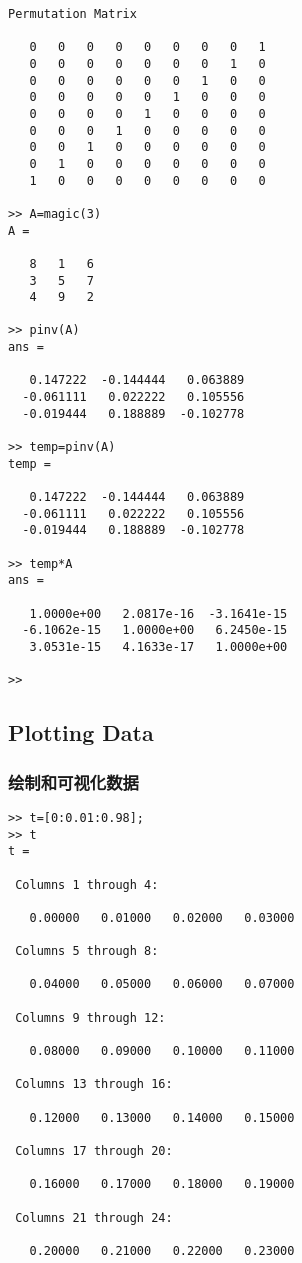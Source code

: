 \documentclass{article}
\begin{document}
\begin{CJK}{UTF8}{gbsn}
\begin{verbatim}
Permutation Matrix

   0   0   0   0   0   0   0   0   1
   0   0   0   0   0   0   0   1   0
   0   0   0   0   0   0   1   0   0
   0   0   0   0   0   1   0   0   0
   0   0   0   0   1   0   0   0   0
   0   0   0   1   0   0   0   0   0
   0   0   1   0   0   0   0   0   0
   0   1   0   0   0   0   0   0   0
   1   0   0   0   0   0   0   0   0

>> A=magic(3)
A =

   8   1   6
   3   5   7
   4   9   2

>> pinv(A)
ans =

   0.147222  -0.144444   0.063889
  -0.061111   0.022222   0.105556
  -0.019444   0.188889  -0.102778

>> temp=pinv(A)
temp =

   0.147222  -0.144444   0.063889
  -0.061111   0.022222   0.105556
  -0.019444   0.188889  -0.102778

>> temp*A
ans =

   1.0000e+00   2.0817e-16  -3.1641e-15
  -6.1062e-15   1.0000e+00   6.2450e-15
   3.0531e-15   4.1633e-17   1.0000e+00

>>
\end{verbatim}
\subsection{Plotting Data}
\subsubsection{绘制和可视化数据}
\begin{verbatim}
>> t=[0:0.01:0.98];
>> t
t =

 Columns 1 through 4:

   0.00000   0.01000   0.02000   0.03000

 Columns 5 through 8:

   0.04000   0.05000   0.06000   0.07000

 Columns 9 through 12:

   0.08000   0.09000   0.10000   0.11000

 Columns 13 through 16:

   0.12000   0.13000   0.14000   0.15000

 Columns 17 through 20:

   0.16000   0.17000   0.18000   0.19000

 Columns 21 through 24:

   0.20000   0.21000   0.22000   0.23000


\end{verbatim}
\end{CJK}
\end{document}
